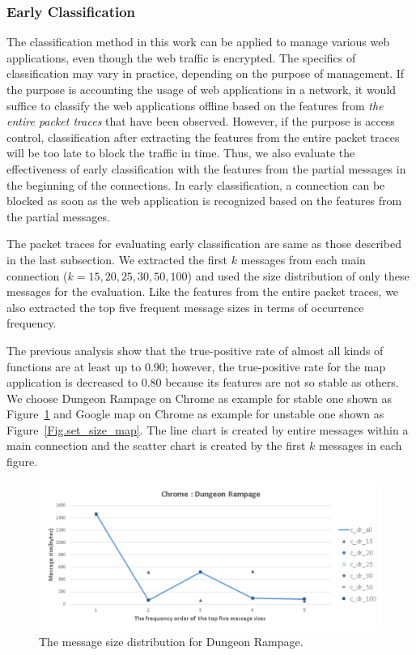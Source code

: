 \documentclass[preprint,12pt]{elsarticle}
\begin{document}
\subsubsection{Early Classification}
\label{sec:early}
The classification method in this work can be applied to manage various web applications, even though the web traffic is encrypted. The specifics of classification may vary in practice, depending on the purpose of management. If the purpose is accounting the usage of web applications in a network, it would suffice to classify the web applications offline based on the features from \emph{the entire packet traces} that have been observed. However, if the purpose is access control, classification after extracting the features from the entire packet traces will be too late to block the traffic in time. Thus, we also evaluate the effectiveness of early classification with the features from the partial messages in the beginning of the connections. In early classification, a connection can be blocked as soon as the web application is recognized based on the features from the partial messages. 

The packet traces for evaluating early classification are same as those described in the last subsection. We extracted the first $k$ messages from each main connection ($k=15, 20, 25, 30, 50, 100$) and used the size distribution of only these messages for the evaluation. Like the features from the entire packet traces, we also extracted the top five frequent message sizes in terms of occurrence frequency.  

The previous analysis show that the true-positive rate of almost all kinds of functions are at least up to 0.90; however, the true-positive rate for the map application is decreased to 0.80 because its features are not so stable as others. We choose Dungeon Rampage on Chrome as example for stable one shown as Figure~\ref{Fig.set_size_dr} and Google map on Chrome as example for unstable one shown as Figure~\ref{Fig.set_size_map}. The line chart is created by entire messages within a main connection and the scatter chart is created by the first $k$ messages in each figure.

\begin{figure}[H]
\begin{center} 
\includegraphics[width=1.1\textwidth]{early_dr}
\end{center}
\caption{The message size distribution for Dungeon Rampage.}
\label{Fig.set_size_dr}
\end{figure}
\end{document}
